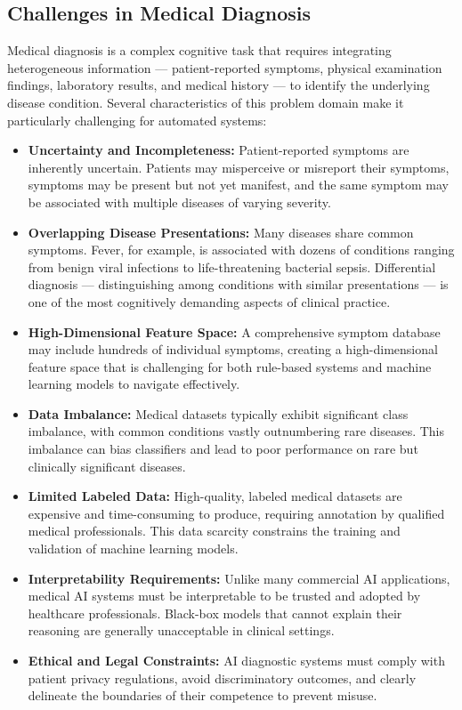 \documentclass[12pt,a4paper]{article}
\begin{document}
\subsection{Challenges in Medical Diagnosis}

Medical diagnosis is a complex cognitive task that requires integrating heterogeneous information --- patient-reported symptoms, physical examination findings, laboratory results, and medical history --- to identify the underlying disease condition. Several characteristics of this problem domain make it particularly challenging for automated systems:

\begin{itemize}[leftmargin=1.5cm]
    \item \textbf{Uncertainty and Incompleteness:} Patient-reported symptoms are inherently uncertain. Patients may misperceive or misreport their symptoms, symptoms may be present but not yet manifest, and the same symptom may be associated with multiple diseases of varying severity.

    \item \textbf{Overlapping Disease Presentations:} Many diseases share common symptoms. Fever, for example, is associated with dozens of conditions ranging from benign viral infections to life-threatening bacterial sepsis. Differential diagnosis --- distinguishing among conditions with similar presentations --- is one of the most cognitively demanding aspects of clinical practice.

    \item \textbf{High-Dimensional Feature Space:} A comprehensive symptom database may include hundreds of individual symptoms, creating a high-dimensional feature space that is challenging for both rule-based systems and machine learning models to navigate effectively.

    \item \textbf{Data Imbalance:} Medical datasets typically exhibit significant class imbalance, with common conditions vastly outnumbering rare diseases. This imbalance can bias classifiers and lead to poor performance on rare but clinically significant diseases.

    \item \textbf{Limited Labeled Data:} High-quality, labeled medical datasets are expensive and time-consuming to produce, requiring annotation by qualified medical professionals. This data scarcity constrains the training and validation of machine learning models.

    \item \textbf{Interpretability Requirements:} Unlike many commercial AI applications, medical AI systems must be interpretable to be trusted and adopted by healthcare professionals. Black-box models that cannot explain their reasoning are generally unacceptable in clinical settings.

    \item \textbf{Ethical and Legal Constraints:} AI diagnostic systems must comply with patient privacy regulations, avoid discriminatory outcomes, and clearly delineate the boundaries of their competence to prevent misuse.
\end{itemize}
\end{document}
